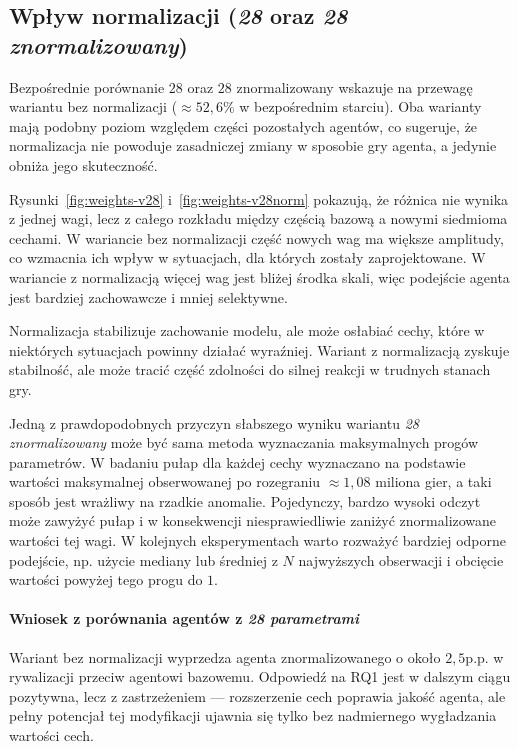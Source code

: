 \subsection{Wpływ normalizacji (\textit{28} oraz \textit{28 znormalizowany})}

Bezpośrednie porównanie \textit{\(28\)} oraz \textit{\(28\)} znormalizowany wskazuje na przewagę wariantu bez normalizacji (\(\approx 52{,}6\%\) w bezpośrednim starciu). Oba warianty mają podobny poziom względem części pozostałych agentów, co sugeruje, że normalizacja nie powoduje zasadniczej zmiany w sposobie gry agenta, a jedynie obniża jego skuteczność.

Rysunki~\ref{fig:weights-v28} i~\ref{fig:weights-v28norm} pokazują, że różnica nie wynika z jednej wagi, lecz z całego rozkładu między częścią bazową a nowymi siedmioma cechami. W wariancie bez normalizacji część nowych wag ma większe amplitudy, co wzmacnia ich wpływ w sytuacjach, dla których zostały zaprojektowane. W wariancie z normalizacją więcej wag jest bliżej środka skali, więc podejście agenta jest bardziej zachowawcze i mniej selektywne.

Normalizacja stabilizuje zachowanie modelu, ale może osłabiać cechy, które w niektórych sytuacjach powinny działać wyraźniej. Wariant z normalizacją zyskuje stabilność, ale może tracić część zdolności do silnej reakcji w trudnych stanach gry.

Jedną z prawdopodobnych przyczyn słabszego wyniku wariantu \textit{28 znormalizowany} może być sama metoda wyznaczania maksymalnych progów parametrów. W badaniu pułap dla każdej cechy wyznaczano na podstawie wartości maksymalnej obserwowanej po rozegraniu $\approx1,08$ miliona gier, a taki sposób jest wrażliwy na rzadkie anomalie. Pojedynczy, bardzo wysoki odczyt może zawyżyć pułap i w konsekwencji niesprawiedliwie zaniżyć znormalizowane wartości tej wagi. W kolejnych eksperymentach warto rozważyć bardziej odporne podejście, np. użycie mediany lub średniej z \(N\) najwyższych obserwacji i obcięcie wartości powyżej tego progu do \(1\).

\paragraph{Wniosek z porównania agentów z \textit{28 parametrami}}
Wariant bez normalizacji wyprzedza agenta znormalizowanego o około \(2{,}5\)p.p. w rywalizacji przeciw agentowi bazowemu. Odpowiedź na RQ1 jest w dalszym ciągu pozytywna, lecz z zastrzeżeniem --- rozszerzenie cech poprawia jakość agenta, ale pełny potencjał tej modyfikacji ujawnia się tylko bez nadmiernego wygładzania wartości cech.

